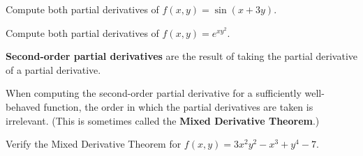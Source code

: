 \documentclass[letterpaper, twoside, 12pt]{book}
\begin{document}
          \begin{solution}

          \end{solution}

          \begin{problem}
            Compute both partial derivatives of $f(x,y)=\sin(x+3y)$.
          \end{problem}

          \begin{solution}

          \end{solution}

          \begin{problem}
            Compute both partial derivatives of $f(x,y)=e^{xy^2}$.
          \end{problem}

          \begin{solution}

          \end{solution}

\begin{definition}
  \textbf{Second-order partial derivatives} are the result of taking the
  partial derivative of a partial derivative.
\end{definition}

\begin{theorem}
  When computing the second-order partial derivative for a sufficiently
  well-behaved function, the order in which the partial
  derivatives are taken is irrelevant. (This is sometimes called the
  \textbf{Mixed Derivative Theorem}.)
\end{theorem}

          \begin{problem}
            Verify the Mixed Derivative Theorem for
            $f(x,y)=3x^2y^2-x^3+y^4-7$.
          \end{problem}

          \begin{solution}

          \end{solution}
\end{document}

